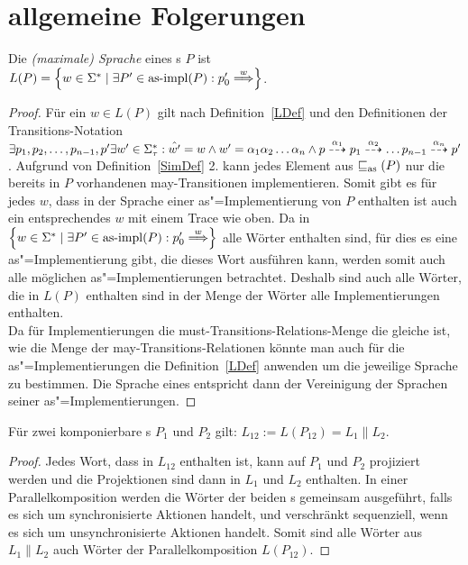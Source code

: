 \chapter{allgemeine Folgerungen}

\begin{Prop}
  \label{LImpProp}
  Die \emph{(maximale) Sprache} eines \MEIO{}s $P$ ist $L(P) = \left\{w\in
  \Sigma ^* \mid \exists P'\in\asimp (P) : p'_0\weakmust[w]
  \right\}$.
\end{Prop}
\begin{proof}
  Für ein $w\in L(P)$ gilt nach Definition~\ref{LDef} und den
  Definitionen der Transitions-Notation $\exists p_1,p_2,\dots,p_{n-1},p' \exists
  w'\in\Sigma _{\tau} ^* : \hat{w'} = w \land w'=\alpha _1\alpha _2\dots\alpha
  _n \land p\may[\alpha _1]p_1\may[\alpha _2] \dots p_{n-1}\may[\alpha _n] p'$.
  Aufgrund von Definition~\ref{SimDef} 2. kann jedes Element aus $\sqsubseteq _{\mathrm{as}} (P)$
  nur die bereits in $P$ vorhandenen may-Transitionen implementieren. Somit
  gibt es für jedes $w$, dass in der Sprache einer as"=Implementierung von $P$
  enthalten ist auch ein entsprechendes $w$ mit einem Trace wie oben. Da in
  $\left\{w\in \Sigma ^* \mid \exists P'\in\asimp (P) : p'_0\weakmust[w]
  \right\}$ alle Wörter enthalten sind, für dies es eine as"=Implementierung
  gibt, die dieses Wort ausführen kann, werden somit auch alle möglichen
  as"=Implementierungen betrachtet. Deshalb sind auch alle Wörter, die in
  $L(P)$ enthalten sind in der Menge der Wörter alle Implementierungen
  enthalten.\\
  Da für Implementierungen die must-Transitions-Relations-Menge die gleiche ist,
  wie die Menge der may-Transitions-Relationen könnte man auch für die
  as"=Implementierungen die Definition~\ref{LDef} anwenden um die jeweilige
  Sprache zu bestimmen. Die Sprache eines \MEIO{} entspricht dann der
  Vereinigung der Sprachen seiner as"=Implementierungen.
\end{proof}

\begin{Prop}
  Für zwei komponierbare \MEIO{}s $P_1$ und $P_2$ gilt: $L_{12} := L(P_{12}) =
  L_1\|L_2$.
\end{Prop}
\begin{proof}
  Jedes Wort, dass in $L_{12}$ enthalten ist, kann auf $P_1$ und $P_2$
  projiziert werden und die Projektionen sind dann in $L_1$ und $L_2$
  enthalten. In einer Parallelkomposition werden die Wörter der beiden \MEIO{}s
  gemeinsam ausgeführt, falls es sich um synchronisierte Aktionen handelt, und
  verschränkt sequenziell, wenn es sich um unsynchronisierte Aktionen handelt.
  Somit sind alle Wörter aus $L_1\|L_2$ auch Wörter der Parallelkomposition
  $L(P_{12})$.
\end{proof}

